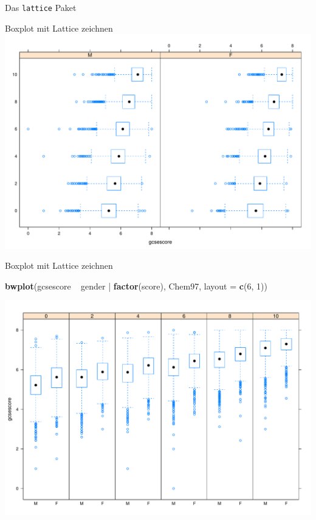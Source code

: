 \documentclass[ignorenonframetext,]{beamer}
\newenvironment{Shaded}{}{}
\newcommand{\KeywordTok}[1]{\textcolor[rgb]{0.00,0.44,0.13}{\textbf{{#1}}}}
\newcommand{\DataTypeTok}[1]{\textcolor[rgb]{0.56,0.13,0.00}{{#1}}}
\newcommand{\DecValTok}[1]{\textcolor[rgb]{0.25,0.63,0.44}{{#1}}}
\newcommand{\StringTok}[1]{\textcolor[rgb]{0.25,0.44,0.63}{{#1}}}
\newcommand{\NormalTok}[1]{{#1}}
\begin{document}
\begin{frame}[fragile]{Das \texttt{lattice} Paket}
\begin{block}{Boxplot mit Lattice zeichnen}
\includegraphics{R_intern_files/figure-beamer/unnamed-chunk-223-1.pdf}

\end{block}

\begin{block}{Boxplot mit Lattice zeichnen}

\begin{Shaded}
\begin{Highlighting}[]
\KeywordTok{bwplot}\NormalTok{(gcsescore ~}\StringTok{ }\NormalTok{gender |}\StringTok{ }\KeywordTok{factor}\NormalTok{(score), Chem97,}
 \DataTypeTok{layout =} \KeywordTok{c}\NormalTok{(}\DecValTok{6}\NormalTok{, }\DecValTok{1}\NormalTok{))}
\end{Highlighting}
\end{Shaded}

\includegraphics{R_intern_files/figure-beamer/unnamed-chunk-224-1.pdf}


\end{block}
\end{frame}
\end{document}
